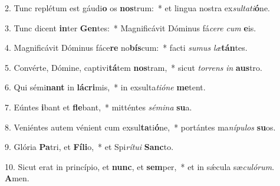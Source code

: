 2. Tunc replétum est gáudi\textbf{o} os \textbf{nos}trum:~*  et lingua nostra ex\textit{sul}\textit{ta}\textit{ti}\textbf{ó}ne.\

3. Tunc dicent \textbf{in}ter \textbf{Gen}tes:~*  Magnificávit Dóminus fá\textit{ce}\textit{re} \textit{cum} \textbf{e}is.\

4. Magnificávit Dóminus fáce\textbf{re} no\textbf{bís}cum:~*  facti \textit{su}\textit{mus} \textit{læ}\textbf{tán}tes.\

5. Convérte, Dómine, captivi\textbf{tá}tem \textbf{nos}tram,~*  sicut \textit{tor}\textit{rens} \textit{in} \textbf{aus}tro.\

6. Qui sémi\textbf{nant} in \textbf{lá}\textbf{cri}mis,~*  in exsulta\textit{ti}\textit{ó}\textit{ne} \textbf{me}tent.\

7. Eúntes \textbf{i}bant et \textbf{fle}bant,~*  mitténtes \textit{sé}\textit{mi}\textit{na} \textbf{su}a.\

8. Veniéntes autem vénient cum exsul\textbf{ta}ti\textbf{ó}ne,~*  portántes ma\textit{ní}\textit{pu}\textit{los} \textbf{su}os.\

9. Glória \textbf{Pa}tri, et \textbf{Fí}\textbf{li}o,~*  et Spi\textit{rí}\textit{tu}\textit{i} \textbf{Sanc}to.\

10. Sicut erat in princípio, et \textbf{nunc}, et \textbf{sem}per,~*  et in sǽcula sæ\textit{cu}\textit{ló}\textit{rum}. \textbf{A}men.\

